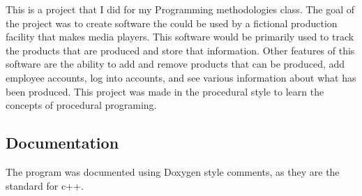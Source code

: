 This is a project that I did for my Programming methodologies class. The goal of the project was to create software the could be used by a fictional production facility that makes media players. This software would be primarily used to track the products that are produced and store that information. Other features of this software are the ability to add and remove products that can be produced, add employee accounts, log into accounts, and see various information about what has been produced. This project was made in the procedural style to learn the concepts of procedural programing.

\subsection*{Documentation}

The program was documented using Doxygen style comments, as they are the standard for c++. 